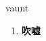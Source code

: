 
\begin{frame}
{\huge vaunt}
\begin{center}
\begin{enumerate}\Large
  \item \textbf{吹嘘}
\end{enumerate}
\end{center}
\end{frame}
